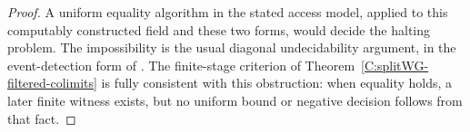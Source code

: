\begin{proof}
A uniform equality algorithm in the stated access model,
applied to this computably constructed field and these two
forms, would decide the halting problem. The impossibility
is the usual diagonal undecidability argument, in the
event-detection form of \cite[\S8, p.248]{C-Turing1936}.
The finite-stage criterion of
Theorem~\ref{C:splitWG-filtered-colimits} is fully consistent
with this obstruction: when equality holds, a later finite
witness exists, but no uniform bound or negative decision
follows from that fact.
\end{proof}
